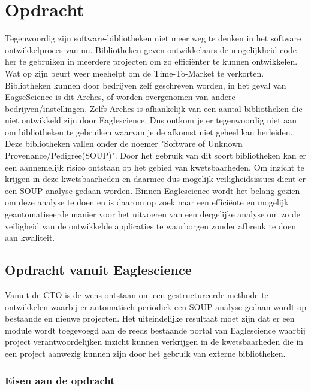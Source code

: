 
\chapter{Opdracht} %
\label{ch:opdracht} %
Tegenwoordig zijn software-bibliotheken niet meer weg te denken in het software ontwikkelproces van nu. Bibliotheken geven ontwikkelaars de mogelijkheid code her te gebruiken in meerdere projecten om zo effici\"enter te kunnen ontwikkelen. Wat op zijn beurt weer meehelpt om de Time-To-Market te verkorten. Bibliotheken kunnen door bedrijven zelf geschreven worden, in het geval van EagseScience is dit Arches, of worden overgenomen van andere bedrijven/instellingen. Zelfs Arches is afhankelijk van een aantal bibliotheken die niet ontwikkeld zijn door Eaglescience. Dus ontkom je er tegenwoordig niet aan om bibliotheken te gebruiken waarvan je de afkomst niet geheel kan herleiden.\\
Deze bibliotheken vallen onder de noemer "Software of Unknown Provenance/Pedigree(SOUP)". Door het gebruik van dit soort bibliotheken kan er een aannemelijk risico ontstaan op het gebied van kwetsbaarheden. Om inzicht te krijgen in deze kwetsbaarheden en daarmee dus mogelijk veiligheidsissues dient er een SOUP analyse gedaan worden. Binnen Eaglescience wordt het belang gezien om deze analyse te doen en is daarom op zoek naar een efficiënte en mogelijk geautomatiseerde manier voor het uitvoeren van een dergelijke analyse om zo de veiligheid van de ontwikkelde applicaties te waarborgen zonder afbreuk te doen aan kwaliteit.

\section{Opdracht vanuit Eaglescience}
Vanuit de CTO is de wens ontstaan om een gestructureerde methode te ontwikkelen waarbij er automatisch periodiek een SOUP analyse gedaan wordt op bestaande en nieuwe projecten. Het uiteindelijke resultaat moet zijn dat er een module wordt toegevoegd aan de reeds bestaande portal van Eaglescience waarbij project verantwoordelijken inzicht kunnen verkrijgen in de kwetsbaarheden die in een project aanwezig kunnen zijn door het gebruik van externe bibliotheken.

\subsection{Eisen aan de opdracht}

